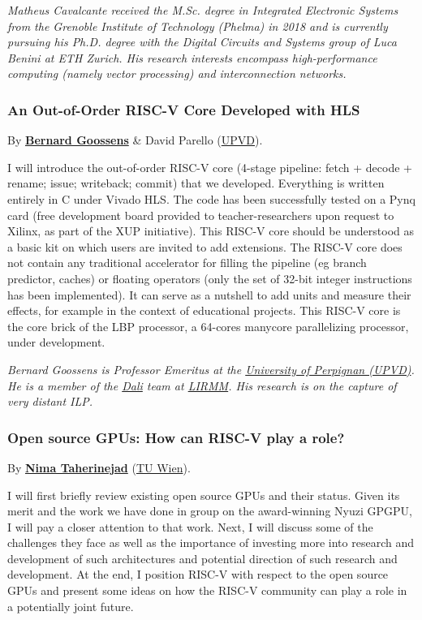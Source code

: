 \documentclass[a4paper, 10pt]{article}
\begin{document}
{\emph{\footnotesize Matheus Cavalcante received the M.Sc. degree in Integrated Electronic Systems from the Grenoble Institute of Technology (Phelma) in 2018 and is currently pursuing his Ph.D. degree with the Digital Circuits and Systems group of Luca Benini at ETH Zurich. His research interests encompass high-performance computing (namely vector processing) and interconnection networks.}

\subsubsection{An Out-of-Order RISC-V Core Developed with HLS}
\label{sec:org2e5f334}
By \textbf{\href{https://perso.univ-perp.fr/bernard.goossens/}{Bernard Goossens}}
\& David Parello (\href{https://webdali.univ-perp.fr}{UPVD}).

I will introduce the out-of-order RISC-V core (4-stage pipeline: fetch +
decode + rename; issue; writeback; commit) that we developed. Everything
is written entirely in C under Vivado HLS. The code has been
successfully tested on a Pynq card (free development board provided to
teacher-researchers upon request to Xilinx, as part of the XUP
initiative). This RISC-V core should be understood as a basic kit on
which users are invited to add extensions. The RISC-V core does not
contain any traditional accelerator for filling the pipeline (eg branch
predictor, caches) or floating operators (only the set of 32-bit integer
instructions has been implemented). It can serve as a nutshell to add
units and measure their effects, for example in the context of
educational projects. This RISC-V core is the core brick of the LBP
processor, a 64-cores manycore parallelizing processor, under
development.

\emph{\footnotesize Bernard Goossens is Professor Emeritus at the \href{https://webdali.univ-perp.fr}{University of Perpignan (UPVD)}. He is a member of the \href{http://www.lirmm.fr/recherche/equipes/dali}{Dali} team at \href{http://www.lirmm.fr}{LIRMM}. His research is on the capture of very distant ILP.}

\subsubsection{Open source GPUs: How can RISC-V play a role?}
\label{sec:org32bc8c5}
By \textbf{\href{https://www.ict.tuwien.ac.at/staff/taherinejad}{Nima
Taherinejad}} (\href{https://www.ict.tuwien.ac.at}{TU Wien}).

I will first briefly review existing open source GPUs and their
status. Given its merit and the work we have done in group on the
award-winning Nyuzi GPGPU, I will pay a closer attention to that work.
Next, I will discuss some of the challenges they face as well as the
importance of investing more into research and development of such
architectures and potential direction of such research and
development.  At the end, I position RISC-V with respect to the open
source GPUs and present some ideas on how the RISC-V community can
play a role in a potentially joint future.

}
\end{document}
